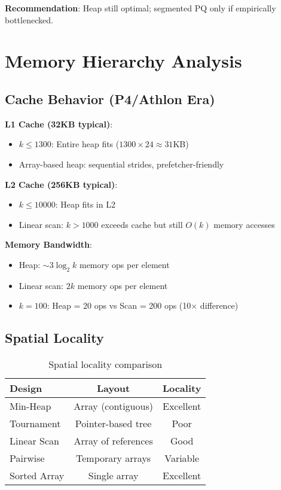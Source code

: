 \documentclass[11pt]{article}
\begin{document}
\textbf{Recommendation}: Heap still optimal; segmented PQ only if empirically bottlenecked.

\section{Memory Hierarchy Analysis}

\subsection{Cache Behavior (P4/Athlon Era)}

\textbf{L1 Cache (32KB typical)}:
\begin{itemize}
    \item $k \leq 1300$: Entire heap fits ($1300 \times 24 \approx 31$KB)
    \item Array-based heap: sequential strides, prefetcher-friendly
\end{itemize}

\textbf{L2 Cache (256KB typical)}:
\begin{itemize}
    \item $k \leq 10000$: Heap fits in L2
    \item Linear scan: $k > 1000$ exceeds cache but still $O(k)$ memory accesses
\end{itemize}

\textbf{Memory Bandwidth}:
\begin{itemize}
    \item Heap: $\sim 3 \log_2 k$ memory ops per element
    \item Linear scan: $2k$ memory ops per element
    \item $k = 100$: Heap = 20 ops vs Scan = 200 ops (10$\times$ difference)
\end{itemize}

\subsection{Spatial Locality}

\begin{table}[h]
\centering
\begin{tabular}{@{}lcc@{}}
\toprule
\textbf{Design}      & \textbf{Layout}     & \textbf{Locality} \\ \midrule
Min-Heap             & Array (contiguous)  & Excellent         \\
Tournament           & Pointer-based tree  & Poor              \\
Linear Scan          & Array of references & Good              \\
Pairwise             & Temporary arrays    & Variable          \\
Sorted Array         & Single array        & Excellent         \\ \bottomrule
\end{tabular}
\caption{Spatial locality comparison}
\end{table}
\end{document}
